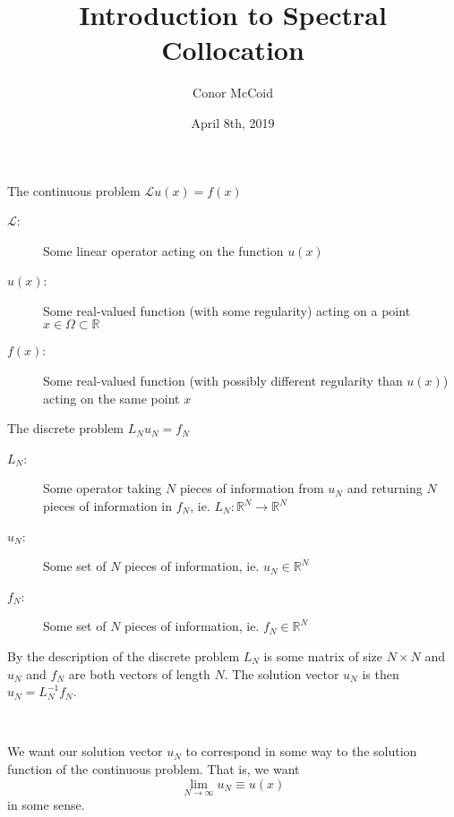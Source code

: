 \documentclass{beamer}
\title{Introduction to Spectral Collocation}
\author{Conor McCoid}
\institute{University of Geneva}
\date{April 8th, 2019}
\begin{document}
\frame{\titlepage}

\begin{frame}

\begin{block}{The continuous problem}
$\mathcal{L} u(x) = f(x)$
\end{block}

\begin{description}
\item[$\mathcal{L}$:] Some linear operator acting on the function $u(x)$
\item[$u(x)$:] Some real-valued function (with some regularity) acting on a point $x \in \Omega \subset \mathbb{R}$
\item[$f(x)$:] Some real-valued function (with possibly different regularity than $u(x)$) acting on the same point $x$
\end{description}

\end{frame}

\begin{frame}

\begin{block}{The discrete problem}
$L_N u_N = f_N$
\end{block}

\begin{description}
\item[$L_N$:] Some operator taking $N$ pieces of information from $u_N$ and returning $N$ pieces of information in $f_N$, ie. $L_N : \mathbb{R}^N \rightarrow \mathbb{R}^N$
\item[$u_N$:] Some set of $N$ pieces of information, ie. $u_N \in \mathbb{R}^N$
\item[$f_N$:] Some set of $N$ pieces of information, ie. $f_N \in \mathbb{R}^N$
\end{description}

\end{frame}

\begin{frame}

By the description of the discrete problem $L_N$ is some matrix of size $N \times N$ and $u_N$ and $f_N$ are both vectors of length $N$.
The solution vector $u_N$ is then $u_N = L_N^{-1} f_N$.

~

We want our solution vector $u_N$ to correspond in some way to the solution function of the continuous problem.
That is, we want
\begin{equation*}
\lim_{N \to \infty} u_N \equiv u(x)
\end{equation*}
in some sense.

\end{frame}
\end{document}
